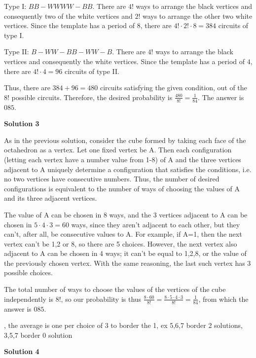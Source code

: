\begin{enumerate}
 Type I: $BB-WWWW-BB$. There are $4!$ ways to arrange the black vertices and consequently two of the white vertices and $2!$ ways to arrange the other two white vertices. Since the template has a period of $8$, there are $4!\cdot 2!\cdot 8 = 384$ circuits of type I.

 Type II: $B-WW-BB-WW-B$. There are $4!$ ways to arrange the black vertices and consequently the white vertices. Since the template has a period of $4$, there are $4! \cdot 4 = 96$ circuits of type II.

 Thus, there are $384+96=480$ circuits satisfying the given condition, out of the $8!$ possible circuits. Therefore, the desired probability is $\frac{480}{8!} = \frac{1}{84}$. The answer is $\boxed{085}$.

 



\textbf{Solution 3}

As in the previous solution, consider the cube formed by taking each face of the octahedron as a vertex. Let one fixed vertex be A. Then each configuration (letting each vertex have a number value from 1-8) of A and the three vertices adjacent to A uniquely determine a configuration that satisfies the conditions, i.e. no two vertices have consecutive numbers. Thus, the number of desired configurations is equivalent to the number of ways of choosing the values of A and its three adjacent vertices. 

 The value of A can be chosen in 8 ways, and the 3 vertices adjacent to A can be chosen in $5\cdot4\cdot3=60$ ways, since they aren't adjacent to each other, but they can't, after all, be consecutive values to A. For example, if A=1, then the next vertex can't be 1,2 or 8, so there are 5 choices. However, the next vertex also adjacent to A can be chosen in 4 ways; it can't be equal to 1,2,8, or the value of the previously chosen vertex. With the same reasoning, the last such vertex has 3 possible choices.

 The total number of ways to choose the values of the vertices of the cube independently is 8!, so our probability is thus $\frac{8\cdot60}{8!}=\frac{8\cdot5\cdot4\cdot3}{8!}=\frac{1}{84}$, from which the answer is $\boxed{085}$.

 , the average is one per choice of 3 to border the 1, ex 5,6,7 border 2 solutions, 3,5,7 border 0 solution

 



\textbf{Solution 4}



\end{enumerate}
